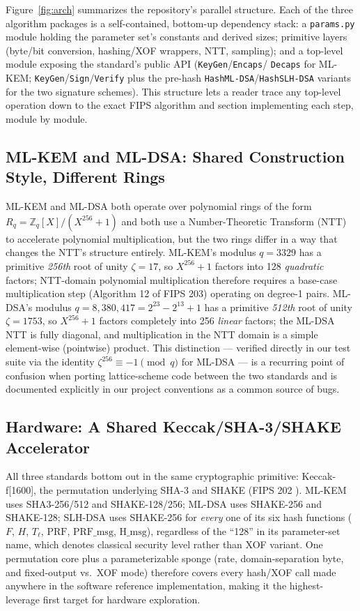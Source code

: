 \documentclass[10pt,conference]{IEEEtran}
\begin{document}
Figure~\ref{fig:arch} summarizes the repository's parallel structure.
Each of the three algorithm packages is a self-contained, bottom-up
dependency stack: a \texttt{params.py} module holding the parameter
set's constants and derived sizes; primitive layers (byte/bit
conversion, hashing/XOF wrappers, NTT, sampling); and a top-level module
exposing the standard's public API (\texttt{KeyGen}/\texttt{Encaps}/
\texttt{Decaps} for ML-KEM; \texttt{KeyGen}/\texttt{Sign}/\texttt{Verify}
plus the pre-hash \texttt{HashML-DSA}/\texttt{HashSLH-DSA} variants for
the two signature schemes). This structure lets a reader trace any
top-level operation down to the exact FIPS algorithm and section
implementing each step, module by module.

\subsection{ML-KEM and ML-DSA: Shared Construction Style, Different Rings}

ML-KEM and ML-DSA both operate over polynomial rings of the form
$R_q = \mathbb{Z}_q[X]/(X^{256}+1)$ and both use a Number-Theoretic
Transform (NTT) to accelerate polynomial multiplication, but the two
rings differ in a way that changes the NTT's structure entirely.
ML-KEM's modulus $q = 3329$ has a primitive \emph{256th} root of unity
$\zeta = 17$, so $X^{256}+1$ factors into 128 \emph{quadratic} factors;
NTT-domain polynomial multiplication therefore requires a base-case
multiplication step (Algorithm 12 of FIPS 203) operating on
degree-1 pairs. ML-DSA's modulus $q = 8{,}380{,}417 = 2^{23} - 2^{13} + 1$
has a primitive \emph{512th} root of unity $\zeta = 1753$, so
$X^{256}+1$ factors completely into 256 \emph{linear} factors; the
ML-DSA NTT is fully diagonal, and multiplication in the NTT domain is a
simple element-wise (pointwise) product. This distinction --- verified
directly in our test suite via the identity $\zeta^{256} \equiv -1
\pmod q$ for ML-DSA --- is a recurring point of confusion when porting
lattice-scheme code between the two standards and is documented
explicitly in our project conventions as a common source of bugs.

\subsection{Hardware: A Shared Keccak/SHA-3/SHAKE Accelerator}

All three standards bottom out in the same cryptographic primitive:
Keccak-f[1600], the permutation underlying SHA-3 and SHAKE (FIPS 202
\cite{fips202}). ML-KEM uses SHA3-256/512 and SHAKE-128/256; ML-DSA uses
SHAKE-256 and SHAKE-128; SLH-DSA uses SHAKE-256 for \emph{every} one of
its six hash functions ($F$, $H$, $T_\ell$, $\mathrm{PRF}$,
$\mathrm{PRF\_msg}$, $\mathrm{H\_msg}$), regardless of the ``128'' in its
parameter-set name, which denotes classical security level rather than
XOF variant. One permutation core plus a parameterizable sponge (rate,
domain-separation byte, and fixed-output vs.\ XOF mode) therefore covers
every hash/XOF call made anywhere in the software reference
implementation, making it the highest-leverage first target for hardware
exploration.
\end{document}
